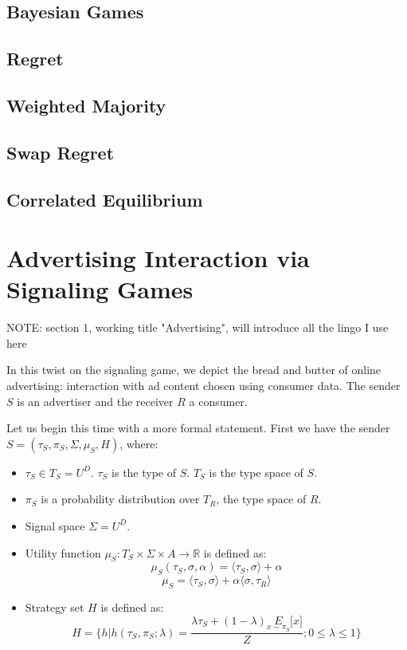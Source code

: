 \documentclass{article}
\begin{document}
\subsection{Bayesian Games}

\subsection{Regret}

\subsection{Weighted Majority}

\subsection{Swap Regret}

\subsection{Correlated Equilibrium}

\section{Advertising Interaction via Signaling Games}

NOTE: section 1, working title "Advertising", will introduce all the lingo I use here

In this twist on the signaling game, we depict the bread and butter of online advertising: interaction with ad content chosen using consumer data. The sender $S$ is an advertiser and the receiver $R$ a consumer.

Let us begin this time with a more formal statement. First we have the sender $S = (\tau_S, \pi_S, \Sigma, \mu_S, H)$, where:
\begin{itemize}
	\item $\tau_S \in T_S = U^D$. $\tau_S$ is the type of $S$. $T_S$ is the type space of $S$.
	\item $\pi_S$ is a probability distribution over $T_R$, the type space of $R$.
	\item Signal space $\Sigma = U^D$.
	\item Utility function $\mu_S: T_S \times \Sigma \times A \rightarrow \mathbb{R}$ is defined as:
	\begin{equation}
		\mu_S(\tau_S, \sigma, \alpha) = \langle \tau_S, \sigma \rangle + \alpha
	\end{equation}
	\begin{equation}
		\mu_S = \langle \tau_S, \sigma \rangle + \alpha \langle \sigma, \tau_R \rangle
	\end{equation}
	\item Strategy set $H$ is defined as:
	\begin{equation}
		H = \lbrace h | h(\tau_S, \pi_S; \lambda) = \frac{\lambda \tau_S + (1-\lambda)\underset{x\sim\pi_S}{E}\lbrack x \rbrack}{Z}; 0 \le \lambda \le 1 \rbrace
	\end{equation}
\end{itemize}
\end{document}
